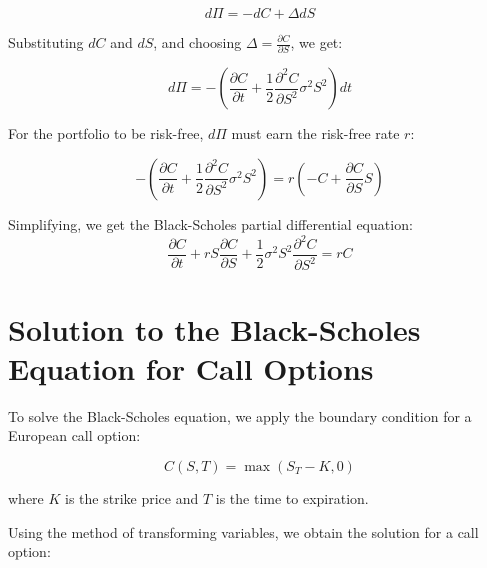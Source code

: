 \documentclass[../Main.tex]{subfiles}
\begin{document}
{		\begin{equation}
			d\Pi = -dC + \Delta dS
		\end{equation}
		
		Substituting \( dC \) and \( dS \), and choosing \( \Delta = \frac{\partial C}{\partial S} \), we get:
		
		\begin{equation}
			d\Pi = -\left( \frac{\partial C}{\partial t} + \frac{1}{2} \frac{\partial^2 C}{\partial S^2} \sigma^2 S^2 \right) dt
		\end{equation}
		
		For the portfolio to be risk-free, \( d\Pi \) must earn the risk-free rate \( r \):
		
		\begin{equation}
			-\left( \frac{\partial C}{\partial t} + \frac{1}{2} \frac{\partial^2 C}{\partial S^2} \sigma^2 S^2 \right) = r \left( -C + \frac{\partial C}{\partial S} S \right)
		\end{equation}
		
		Simplifying, we get the Black-Scholes partial differential equation:
		\begin{equation*}
			\frac{\partial C}{\partial t} + r S \frac{\partial C}{\partial S} + \frac{1}{2} \sigma^2 S^2 \frac{\partial^2 C}{\partial S^2} = r C
		\end{equation*}
		
	}
	
	
	
	\section{Solution to the Black-Scholes Equation for Call Options}
	
	To solve the Black-Scholes equation, we apply the boundary condition for a European call option:
	
	\begin{equation}
		C(S, T) = \max(S_T - K, 0)
	\end{equation}
	
	where \( K \) is the strike price and \( T \) is the time to expiration.
	
	Using the method of transforming variables, we obtain the solution for a call option:
	
	
\end{document}
